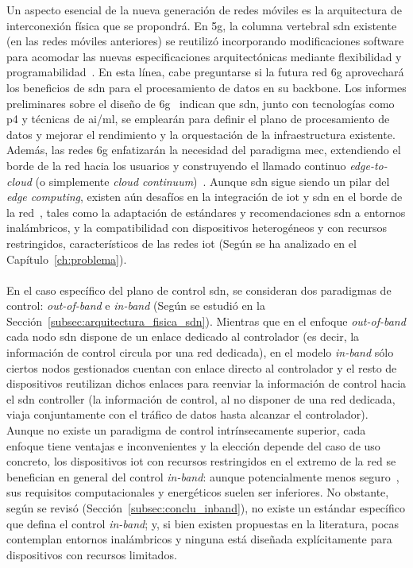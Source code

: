 Un aspecto esencial de la nueva generación de redes móviles es la arquitectura de interconexión física que se propondrá. En \gls{5g}, la columna vertebral \gls{sdn} existente (en las redes móviles anteriores) se reutilizó incorporando modificaciones software para acomodar las nuevas especificaciones arquitectónicas mediante flexibilidad y programabilidad~\cite{Li2018}. En esta línea, cabe preguntarse si la futura red \gls{6g} aprovechará los beneficios de \gls{sdn} para el procesamiento de datos en su backbone. Los informes preliminares sobre el diseño de \gls{6g}~\cite{uusitalo20216g,6garch1,6garch2} indican que \gls{sdn}, junto con tecnologías como \gls{p4} y técnicas de \gls{ai}/\gls{ml}, se emplearán para definir el plano de procesamiento de datos y mejorar el rendimiento y la orquestación de la infraestructura existente. Además, las redes \gls{6g} enfatizarán la necesidad del paradigma \gls{mec}, extendiendo el borde de la red hacia los usuarios y construyendo el llamado continuo \textit{edge-to-cloud} (o simplemente \textit{cloud continuum})~\cite{Milojicic20}. Aunque \gls{sdn} sigue siendo un pilar del \textit{edge computing}, existen aún desafíos en la integración de \gls{iot} y \gls{sdn} en el borde de la red~\cite{Bittencourt18}, tales como la adaptación de estándares y recomendaciones \gls{sdn} a entornos inalámbricos, y la compatibilidad con dispositivos heterogéneos y con recursos restringidos, característicos de las redes \gls{iot} (Según se ha analizado en el Capítulo~\ref{ch:problema}).\\
\\
En el caso específico del plano de control \gls{sdn}, se consideran dos paradigmas de control: \textit{out-of-band} e \textit{in-band} (Según se estudió en la Sección~\ref{subsec:arquitectura_fisica_sdn}). Mientras que en el enfoque \textit{out-of-band} cada nodo \gls{sdn} dispone de un enlace dedicado al controlador (es decir, la información de control circula por una red dedicada), en el modelo \textit{in-band} sólo ciertos nodos gestionados cuentan con enlace directo al controlador y el resto de dispositivos reutilizan dichos enlaces para reenviar la información de control hacia el \gls{sdn} controller (la información de control, al no disponer de una red dedicada, viaja conjuntamente con el tráfico de datos hasta alcanzar el controlador). Aunque no existe un paradigma de control intrínsecamente superior, cada enfoque tiene ventajas e inconvenientes y la elección depende del caso de uso concreto, los dispositivos \gls{iot} con recursos restringidos en el extremo de la red se benefician en general del control \textit{in-band}: aunque potencialmente menos seguro~\cite{feghali2015sdn}, sus requisitos computacionales y energéticos suelen ser inferiores. No obstante, según se revisó (Sección~\ref{subsec:conclu_inband}), no existe un estándar específico que defina el control \textit{in-band}; y, si bien existen propuestas en la literatura, pocas contemplan entornos inalámbricos y ninguna está diseñada explícitamente para dispositivos con recursos limitados.\\
